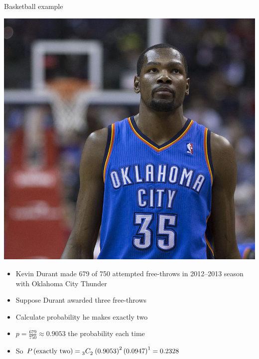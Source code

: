 \documentclass[handout,xcolor=dvipsnames]{beamer}
\theoremstyle{definition}
\newcommand\ncr[2]{\tensor[_{#1}]C{_{#2}}}
\begin{document}
\begin{frame}{Basketball example}
\begin{multicols}{2}
\includegraphics[scale=.75]{KevinDurant}
\begin{itemize}
\item Kevin Durant made 679 of 750 attempted free-throws
in 2012--2013 season with Oklahoma City Thunder
\item Suppose Durant awarded three free-throws
\item Calculate probability he makes exactly two
\item $p=\frac{679}{750}\approx 0.9053$ the probability
each time
\item So $P\left(\text{exactly two}\right)
=\ncr{3}{2}\left(0.9053\right)^2\left(0.0947\right)^1=0.2328$
\end{itemize}
\end{multicols}
\end{frame}
\end{document}
